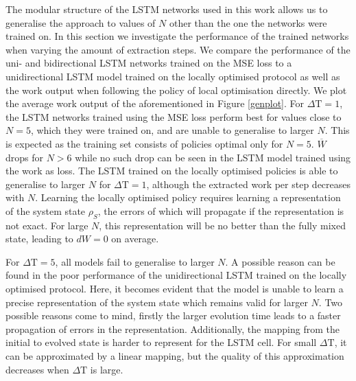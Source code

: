 The modular structure of the LSTM networks used in this work allows us to generalise the approach to values of $N$ other than the one the networks were trained on.
In this section we investigate the performance of the trained networks when varying the amount of extraction steps.
We compare the performance of the uni- and bidirectional LSTM networks trained on the MSE loss to a unidirectional LSTM model trained on the locally optimised protocol as well as the work output when following the policy of local optimisation directly.
We plot the average work output of the aforementioned in Figure \ref{genplot}.
For $\Delta \mathrm{T} = 1$, the LSTM networks trained using the MSE loss perform best for values close to $N=5$, which they were trained on, and are unable to generalise to larger $N$.
This is expected as the training set consists of policies optimal only for $N=5$.
$\overline{W}$ drops for $N > 6$ while no such drop can be seen in the LSTM model trained using the work as loss.
The LSTM trained on the locally optimised policies is able to generalise to larger $N$ for $\Delta \mathrm{T} = 1$, although the extracted work per step decreases with $N$.
Learning the locally optimised policy requires learning a representation of the system state $\rho_S$, the errors of which will propagate if the representation is not exact.
For large $N$, this representation will be no better than the fully mixed state, leading to $dW = 0$ on average.

For $\Delta \mathrm{T} = 5$, all models fail to generalise to larger $N$.
A possible reason can be found in the poor performance of the unidirectional LSTM trained on the locally optimised protocol.
Here, it becomes evident that the model is unable to learn a precise representation of the system state which remains valid for larger $N$.
Two possible reasons come to mind, firstly the larger evolution time leads to a faster propagation of errors in the representation.
Additionally, the mapping from the initial to evolved state is harder to represent for the LSTM cell.
For small $\Delta \mathrm{T}$, it can be approximated by a linear mapping, but the quality of this approximation decreases when $\Delta \mathrm{T}$ is large.

